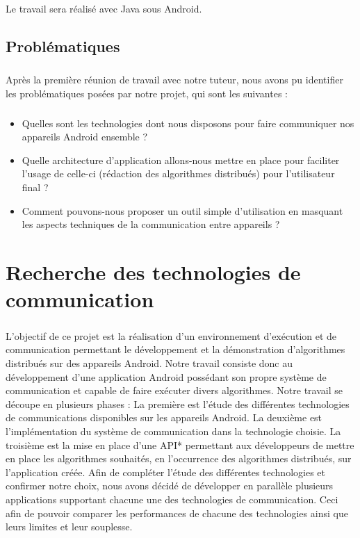 \documentclass[a4paper,10pt]{report}
\begin{document}
  \paragraph{}
  Le travail sera réalisé avec Java sous Android.
  
  \section{Problématiques}
  \paragraph{}
  Après la première réunion de travail avec notre tuteur, nous avons pu identifier les problématiques posées par notre projet, qui sont les suivantes :
\paragraph{}
  \begin{itemize}
    \item Quelles sont les technologies dont nous disposons pour faire communiquer nos appareils Android ensemble ?
    \newline
    \item Quelle architecture d'application allons-nous mettre en place pour faciliter l'usage de celle-ci (rédaction des algorithmes distribués) pour l'utilisateur final ?
    \newline
    \item Comment pouvons-nous proposer un outil simple d'utilisation en masquant les aspects techniques de la communication entre appareils ?
  \end{itemize}
  
  
\chapter{Recherche des technologies de communication}
  \paragraph{}
  L'objectif de ce projet est la réalisation d'un environnement d'exécution et de communication permettant le développement et la démonstration d'algorithmes distribués sur des appareils Android. Notre travail consiste donc au développement d'une application Android possédant son propre système de communication et capable de faire exécuter divers algorithmes.
  Notre travail se découpe en plusieurs phases :
  La première est l'étude des différentes technologies de communications disponibles sur les appareils Android.
  La deuxième est l'implémentation du système de communication dans la technologie choisie.
  La troisième est la mise en place d'une API* permettant aux développeurs de mettre en place les algorithmes souhaités, en l'occurrence des algorithmes distribués, sur l'application créée.
  Afin de compléter l'étude des différentes technologies et confirmer notre choix, nous avons décidé de développer en parallèle plusieurs applications supportant chacune une des technologies de communication. Ceci afin de pouvoir comparer les performances de chacune des technologies ainsi que leurs limites et leur souplesse.
\end{document}
